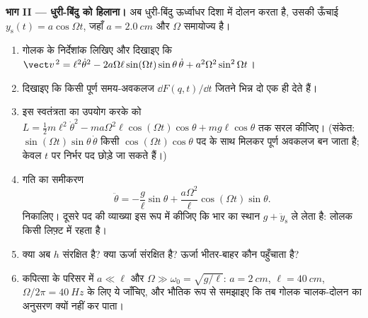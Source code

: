 \begin{problem}
\medskip\noindent\textbf{भाग II --- धुरी-बिंदु को हिलाना।}
अब धुरी-बिंदु ऊर्ध्वाधर दिशा में दोलन करता है, उसकी ऊँचाई $y_{\text{s}}(t) =
a\cos\Omega t$, जहाँ $a = \qty{2.0}{cm}$ और $\Omega$ समायोज्य है।
\begin{enumerate}[resume]
  \item गोलक के निर्देशांक लिखिए और दिखाइए कि
        $\vect v^{\,2} = \ell^2\dot\theta^2 -
        2a\Omega\ell\sin(\Omega t)\sin\theta\,\dot\theta +
        a^2\Omega^2\sin^2\Omega t$।
  \item दिखाइए कि किसी पूर्ण समय-अवकलज $\dd F(q,t)/\dd t$ जितने भिन्न
        दो  एक ही  देते हैं।
  \item इस स्वतंत्रता का उपयोग करके  को $L = \tfrac12 m
        \ell^2\dot\theta^2 - ma\Omega^2\ell\cos(\Omega t)\cos\theta +
        mg\ell\cos\theta$ तक सरल कीजिए। (संकेत:
        $\sin(\Omega t)\sin\theta\,\dot\theta$ किसी
        $\cos(\Omega t)\cos\theta$ पद के साथ मिलकर पूर्ण अवकलज बन जाता
        है; केवल $t$ पर निर्भर पद छोड़े जा सकते हैं।)
  \item गति का समीकरण
        \[
        \ddot\theta = -\frac{g}{\ell}\sin\theta
         + \frac{a\Omega^2}{\ell}\cos(\Omega t)\sin\theta .
        \]
        निकालिए। दूसरे पद की व्याख्या इस रूप में कीजिए कि भार का स्थान $g +
        \ddot y_{\text{s}}$ ले लेता है: लोलक किसी लिफ़्ट में रहता है।
  \item क्या अब  $h$ संरक्षित है? क्या ऊर्जा संरक्षित है?
        ऊर्जा भीतर-बाहर कौन पहुँचाता है?
  \item कपित्सा के परिसर में $a \ll \ell$ और $\Omega \gg \omega_0 =
        \sqrt{g/\ell}$: $a = \qty{2}{cm}$, $\ell =
        \qty{40}{cm}$, $\Omega/2\pi = \qty{40}{Hz}$ के लिए ये जाँचिए,
        और भौतिक रूप से समझाइए कि तब गोलक चालक-दोलन का अनुसरण क्यों
        नहीं कर पाता।
\end{enumerate}


\end{problem}
